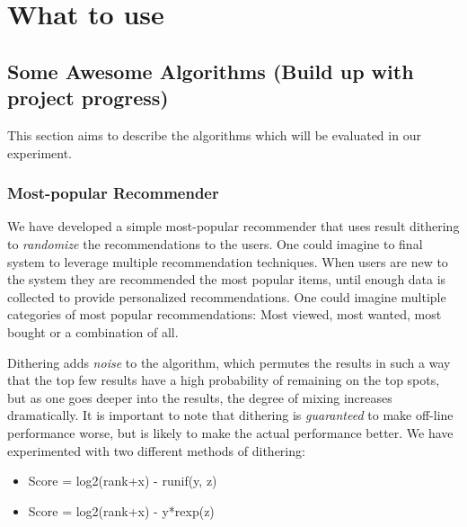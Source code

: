 
\section{What to use}




\subsection{Some Awesome Algorithms (Build up with project progress)}

This section aims to describe the algorithms which will be evaluated in our experiment.

\subsubsection{Most-popular Recommender}

We have developed a simple most-popular recommender that uses result dithering to \emph{randomize} the recommendations to the users. One could imagine to final system to leverage multiple recommendation techniques. When users are new to the system they are recommended the most popular items, until enough data is collected to provide personalized recommendations. One could imagine multiple categories of most popular recommendations: Most viewed, most wanted, most bought or a combination of all.

Dithering adds \emph{noise} to the algorithm, which permutes the results in such a way that the top few results have a high probability of remaining on the top spots, but as one goes deeper into the results, the degree of mixing increases dramatically. It is important to note that dithering is \emph{guaranteed} to make off-line performance worse, but is likely to make the actual performance better. We have experimented with two different methods of dithering:

\begin{itemize}
\item Score = log2(rank+x) - runif(y, z)
\item Score = log2(rank+x) - y*rexp(z)
\end{itemize}


